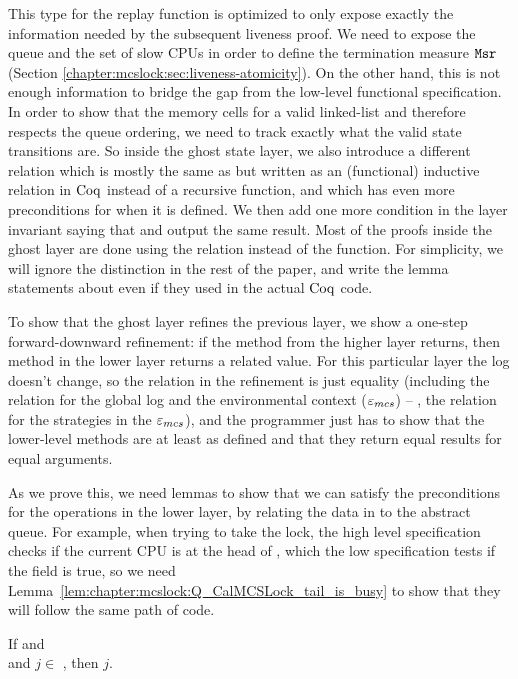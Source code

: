 This type for the replay function is optimized to only expose exactly the information needed by the subsequent liveness proof. 
We need to expose the queue and the set of slow CPUs in order to define the termination measure ${\mathrm{\texttt{Msr}}}$
 (Section \ref{chapter:mcslock:sec:liveness-atomicity}). 
 On the other hand, this is not enough information to bridge the gap from the low-level functional specification. 
 In order to show that the memory cells for a valid linked-list and therefore respects the queue
ordering, we need to track exactly what the valid state transitions are. So inside the ghost state layer, 
we also introduce a different relation   
which is mostly the same as  but written as an (functional) inductive relation 
in $\mathrm{Coq}$ instead of a recursive function, and which has even more preconditions for when it is defined. 
We then add one more condition in the layer invariant saying that  and  output the same
result. Most of the proofs inside the ghost layer are done using the relation instead of the function.
For simplicity, we will ignore the distinction in the rest of the paper, 
and write the lemma statements about  even if they used  in the actual $\mathrm{Coq}$ code.


To show that the ghost layer refines the previous layer, we show a
one-step forward-downward refinement: if the method from the higher
layer returns, then method in the lower layer returns a related
value. For this particular layer the log doesn't change, so the
relation in the refinement is just equality (including the relation for the global log and the environmental context (${\varepsilon}_{mcs}$) -- \ie, the relation for the strategies in the ${\varepsilon}_{mcs}$), 
and the programmer just
has to show that the lower-level methods are at least as defined and
that they return equal results for equal arguments.


As we prove this, we need lemmas to show that we can satisfy the preconditions for the operations in the lower layer, by relating the data in  to the abstract queue.  For example, when trying to take the lock, the high level specification checks if the current CPU is at the head of , which the low specification tests if the  field is true, so we need Lemma~\ref{lem:chapter:mcslock:Q_CalMCSLock_tail_is_busy} to show that they will follow the same path of code. 


\begin{lemma}
\label{lem:chapter:mcslock:Q_CalMCSLock_tail_is_busy}

    If  and \\
     and $j \in$ , then \code{lock$\_$array[}$j$\code{] = (true, $\_$)}.
\end{lemma}

